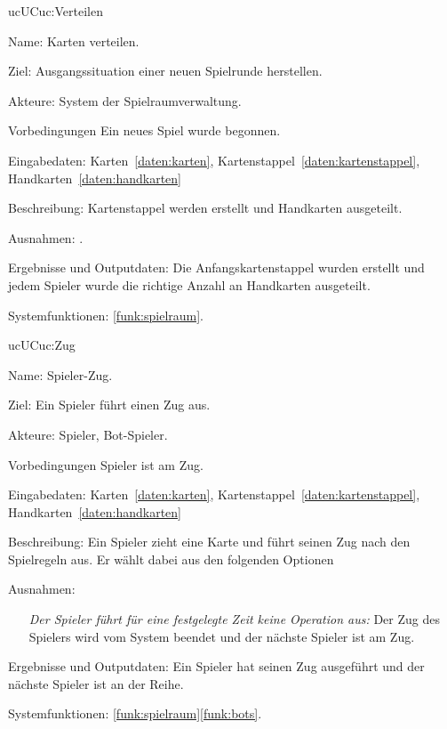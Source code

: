 \begin{description}[leftmargin=5em, style=sameline]
	\begin{lhp}{uc}{UC}{uc:Verteilen}
		\item [Name:] Karten verteilen.
		\item [Ziel:] Ausgangssituation einer neuen Spielrunde herstellen.
		\item [Akteure:] System der Spielraumverwaltung.
		\item [Vorbedingungen] Ein neues Spiel wurde begonnen.
		\item [Eingabedaten:] Karten~\ref{daten:karten}, Kartenstappel~\ref{daten:kartenstappel}, Handkarten~\ref{daten:handkarten} 
		\item [Beschreibung:] Kartenstappel werden erstellt und Handkarten ausgeteilt.
		\item [Ausnahmen:] .
		\item [Ergebnisse und Outputdaten:] Die Anfangskartenstappel wurden erstellt und jedem Spieler wurde die richtige Anzahl an Handkarten ausgeteilt.
		\item [Systemfunktionen:] \ref{funk:spielraum}.
	\end{lhp}
	
	\begin{lhp}{uc}{UC}{uc:Zug}
		\item [Name:] Spieler-Zug.
		\item [Ziel:] Ein Spieler führt einen Zug aus.
		\item [Akteure:] Spieler, Bot-Spieler.
		\item [Vorbedingungen] Spieler ist am Zug.
		\item [Eingabedaten:] Karten~\ref{daten:karten}, Kartenstappel~\ref{daten:kartenstappel}, Handkarten~\ref{daten:handkarten} 
		\item [Beschreibung:] Ein Spieler zieht eine Karte und führt seinen Zug nach den Spielregeln aus. Er wählt dabei aus den folgenden Optionen
		\item [Ausnahmen:] \hfill
			\begin{itemize} 
				\item[] \textit{Der Spieler führt für eine festgelegte Zeit keine Operation aus:} Der Zug des
				Spielers wird vom System beendet und der nächste Spieler ist am Zug.
			\end{itemize}
		\item [Ergebnisse und Outputdaten:] Ein Spieler hat seinen Zug ausgeführt und der nächste Spieler ist an der Reihe.
		\item [Systemfunktionen:] \ref{funk:spielraum}\ref{funk:bots}.
	\end{lhp}
	

\end{description}

